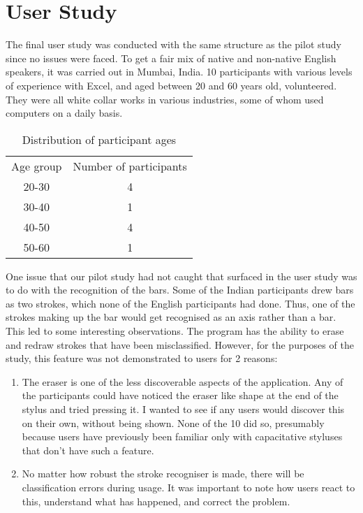 \section{User Study}
The final user study was conducted with the same structure as the pilot study since no issues were faced. To get a fair mix of native and non-native English speakers, it was carried out in Mumbai, India. 10 participants with various levels of experience with Excel, and aged between 20 and 60 years old, volunteered. They were all white collar works in various industries, some of whom used computers on a daily basis.

\begin{table}
\begin{center}
\begin{tabular}{c c}
Age group & Number of participants \\
20-30 & 4 \\
30-40 & 1 \\
40-50 & 4 \\
50-60 & 1 \\

\end{tabular}
\end{center}
\caption{Distribution of participant ages}
\end{table}

One issue that our pilot study had not caught that surfaced in the user study was to do with the recognition of the bars. Some of the Indian participants drew bars as two strokes, which none of the English participants had done. Thus, one of the strokes making up the bar would get recognised as an axis rather than a bar. This led to some interesting observations. The program has the ability to erase and redraw strokes that have been misclassified. However, for the purposes of the study, this feature was not demonstrated to users for 2 reasons:
\begin{enumerate}
\item The eraser is one of the less discoverable aspects of the application. Any of the participants could have noticed the eraser like shape at the end of the stylus and tried pressing it. I wanted to see if any users would discover this on their own, without being shown. None of the 10 did so, presumably because users have previously been familiar only with capacitative styluses that don't have such a feature. 
\item No matter how robust the stroke recogniser is made, there will be classification errors during usage. It was important to note how users react to this, understand what has happened, and correct the problem.
\end{enumerate} 

